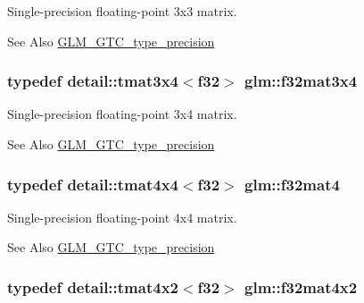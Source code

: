 Single-\/precision floating-\/point 3x3 matrix. 

\begin{DoxySeeAlso}{See Also}
\hyperlink{group__gtc__type__precision}{G\-L\-M\-\_\-\-G\-T\-C\-\_\-type\-\_\-precision} 
\end{DoxySeeAlso}
\hypertarget{group__gtc__type__precision_ga6ca7c9195aeb5fdc8a6b8dcba6ce4ab3}{
\subsubsection[{f32mat3x4}]{\setlength{\rightskip}{0pt plus 5cm}typedef detail\-::tmat3x4$<$f32$>$ {\bf glm\-::f32mat3x4}}}\label{group__gtc__type__precision_ga6ca7c9195aeb5fdc8a6b8dcba6ce4ab3}


Single-\/precision floating-\/point 3x4 matrix. 

\begin{DoxySeeAlso}{See Also}
\hyperlink{group__gtc__type__precision}{G\-L\-M\-\_\-\-G\-T\-C\-\_\-type\-\_\-precision} 
\end{DoxySeeAlso}
\hypertarget{group__gtc__type__precision_gaf7b538eba9a2dd812c39ac7145e7cd93}{
\subsubsection[{f32mat4}]{\setlength{\rightskip}{0pt plus 5cm}typedef detail\-::tmat4x4$<$f32$>$ {\bf glm\-::f32mat4}}}\label{group__gtc__type__precision_gaf7b538eba9a2dd812c39ac7145e7cd93}


Single-\/precision floating-\/point 4x4 matrix. 

\begin{DoxySeeAlso}{See Also}
\hyperlink{group__gtc__type__precision}{G\-L\-M\-\_\-\-G\-T\-C\-\_\-type\-\_\-precision} 
\end{DoxySeeAlso}
\hypertarget{group__gtc__type__precision_ga0049d706c1dc65ea5212a7b0ce64b0f0}{
\subsubsection[{f32mat4x2}]{\setlength{\rightskip}{0pt plus 5cm}typedef detail\-::tmat4x2$<$f32$>$ {\bf glm\-::f32mat4x2}}}\label{group__gtc__type__precision_ga0049d706c1dc65ea5212a7b0ce64b0f0}


